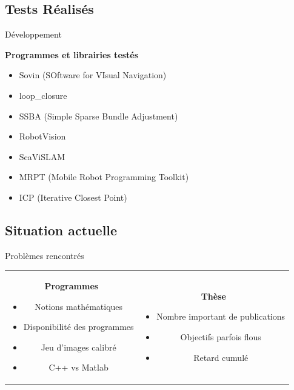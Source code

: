 \documentclass{beamer}
\begin{document}
\subsection*{Tests Réalisés}
\begin{frame}{Développement}
  \begin{center}
    \begin{Large}
      \textbf{Programmes et librairies testés}
    \end{Large}
  \end{center}
  \begin{itemize}
  \item Sovin (SOftware for VIsual Navigation)
  \item loop\_closure
  \item SSBA (Simple Sparse Bundle Adjustment)
  \item RobotVision
  \item ScaViSLAM
  \item MRPT (Mobile Robot Programming Toolkit)
  \item ICP (Iterative Closest Point)
  \end{itemize}
\end{frame}

\subsection*{Situation actuelle}
\begin{frame}{Problèmes rencontrés}

  \begin{tabular}{c | c}
    \begin{minipage}{0.5\linewidth}
      \begin{center}
        \begin{Large}
          \textbf{Programmes}
        \end{Large}
      \end{center}
      \begin{itemize}
      \item Notions mathématiques
      \item Disponibilité des programmes
      \item Jeu d'images calibré
      \item C++ vs Matlab
      \end{itemize}
    \end{minipage}
    &
    \begin{minipage}{0.5\linewidth}
      \begin{center}
        \begin{Large}
          \textbf{Thèse}
        \end{Large}
      \end{center}
      \begin{itemize}
      \item Nombre important de publications
      \item Objectifs parfois flous
      \item Retard cumulé
      \end{itemize}
    \end{minipage}
  \end{tabular}
\end{frame}
\end{document}
